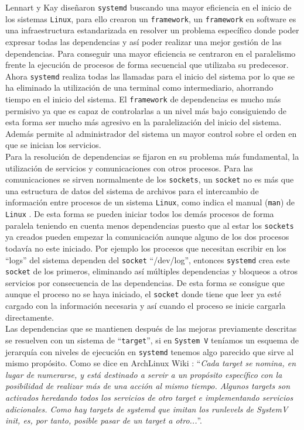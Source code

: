 Lennart y Kay diseñaron \texttt{systemd} buscando una mayor eficiencia en el inicio de los sistemas \texttt{Linux}, para ello crearon un \texttt{framework}, un \texttt{framework} en software es una infraestructura estandarizada en resolver un problema específico donde poder expresar todas las dependencias y así poder realizar una mejor gestión de las dependencias. Para conseguir una mayor eficiencia se centraron en el paralelismo frente la ejecución de procesos de forma secuencial que utilizaba su predecesor. Ahora \texttt{systemd} realiza todas las llamadas para el inicio del sistema por lo que se ha eliminado la utilización de una terminal como intermediario, ahorrando tiempo en el inicio del sistema. El \texttt{framework} de dependencias es mucho más permisivo ya que es capaz de controlarlas a un nivel más bajo consiguiendo de esta forma ser mucho más agresivo en la paralelización del inicio del sistema. Además permite al administrador del sistema un mayor control sobre el orden en que se inician los servicios.\\

Para la resolución de dependencias se fijaron en su problema más fundamental, la utilización de servicios y comunicaciones con otros procesos. Para las comunicaciones se sirven normalmente de los \texttt{sockets}, un \texttt{socket} no es más que una estructura de datos del sistema de archivos para el intercambio de información entre procesos de un sistema \texttt{Linux}, como indica el manual (\texttt{man}) de \texttt{Linux} \cite{socket}. De esta forma se pueden iniciar todos los demás procesos de forma paralela teniendo en cuenta menos dependencias puesto que al estar los \texttt{sockets} ya creados pueden empezar la comunicación aunque alguno de los dos procesos todavía no este iniciado. Por ejemplo los procesos que necesitan escribir en los ``logs'' del sistema dependen del \texttt{socket} ``/dev/log'', entonces \texttt{systemd} crea este \texttt{socket} de los primeros, eliminando así múltiples dependencias y bloqueos a otros servicios por consecuencia de las dependencias. De esta forma se consigue que aunque el proceso no se haya iniciado, el \texttt{socket} donde tiene que leer ya esté cargado con la información necesaria y así cuando el proceso se inicie cargarla directamente. \\

Las dependencias que se mantienen después de las mejoras previamente descritas se resuelven con un sistema de ``\texttt{target}'', si en \texttt{System V} teníamos un esquema de jerarquía con niveles de ejecución en \texttt{systemd} tenemos algo parecido que sirve al mismo propósito. Como se dice en ArchLinux Wiki \cite{systemd_es}: ``\textit{Cada target se nomina, en lugar de numerarse, y está destinado a servir a un propósito específico con la posibilidad de realizar más de una acción al mismo tiempo. Algunos targets son activados heredando todos los servicios de otro target e implementando servicios adicionales. Como hay targets de systemd que imitan los runlevels de SystemV init, es, por tanto, posible pasar de un target a otro...}''.\\


